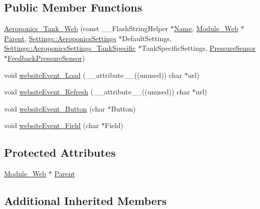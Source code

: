 \subsection*{Public Member Functions}
\begin{DoxyCompactItemize}
\item 
\hyperlink{class_aeroponics___tank___web_ad54536abd76cc156d1d59b55750074de}{Aeroponics\+\_\+\+Tank\+\_\+\+Web} (const \+\_\+\+\_\+\+Flash\+String\+Helper $\ast$\hyperlink{class_common_aeea91a726dbe988e515057b32ba0726f}{Name}, \hyperlink{class_module___web}{Module\+\_\+\+Web} $\ast$\hyperlink{class_aeroponics___tank___web_a21784503514649d7972a697042809e90}{Parent}, \hyperlink{struct_settings_1_1_aeroponics_settings}{Settings\+::\+Aeroponics\+Settings} $\ast$Default\+Settings, \hyperlink{struct_settings_1_1_aeroponics_settings___tank_specific}{Settings\+::\+Aeroponics\+Settings\+\_\+\+Tank\+Specific} $\ast$Tank\+Specific\+Settings, \hyperlink{class_pressure_sensor}{Pressure\+Sensor} $\ast$\hyperlink{class_aeroponics_ab5e9a2fe86a36e1e84876eb1366a2bfb}{Feedback\+Pressure\+Sensor})
\item 
void \hyperlink{class_aeroponics___tank___web_a49ab14d7f9bffac4f4d9adf151589f15}{website\+Event\+\_\+\+Load} (\+\_\+\+\_\+attribute\+\_\+\+\_\+((unused)) char $\ast$url)
\item 
void \hyperlink{class_aeroponics___tank___web_acf883f3ff9b052706ea0548bdf8c04aa}{website\+Event\+\_\+\+Refresh} (\+\_\+\+\_\+attribute\+\_\+\+\_\+((unused)) char $\ast$url)
\item 
void \hyperlink{class_aeroponics___tank___web_a2dea9353cb1709b51f496d8d0caa928e}{website\+Event\+\_\+\+Button} (char $\ast$Button)
\item 
void \hyperlink{class_aeroponics___tank___web_a5693a6f3eacc0a155e5639607368e0ea}{website\+Event\+\_\+\+Field} (char $\ast$Field)
\end{DoxyCompactItemize}
\subsection*{Protected Attributes}
\begin{DoxyCompactItemize}
\item 
\hyperlink{class_module___web}{Module\+\_\+\+Web} $\ast$ \hyperlink{class_aeroponics___tank___web_a21784503514649d7972a697042809e90}{Parent}
\end{DoxyCompactItemize}
\subsection*{Additional Inherited Members}


